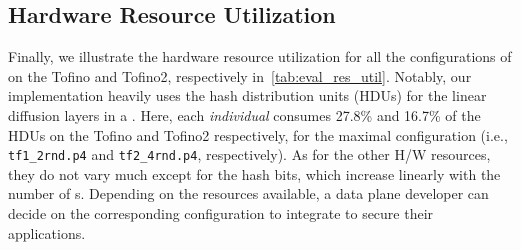
\subsection{Hardware Resource Utilization}


% 

Finally, we illustrate the hardware resource utilization for all the configurations of \sysname on the 
Tofino and Tofino2, respectively in~\cref{tab:eval_res_util}.
Notably, our implementation heavily uses the hash distribution units (HDUs) for the linear diffusion layers in a \pround.
Here, each \emph{individual} \pround consumes 27.8\% and 16.7\% of the HDUs on the Tofino and Tofino2 respectively, for the maximal configuration (i.e., \texttt{tf1\_2rnd.p4} and \texttt{tf2\_4rnd.p4}, respectively).
As for the other H/W resources, they do not vary much except for the hash bits, which increase linearly with the number of {\pround}s.
Depending on the resources available, a data plane developer can decide on the corresponding configuration to integrate \sysname to secure their applications.




